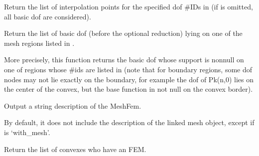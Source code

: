 \documentclass[a4paper,11pt,english]{sphinxmanual}
\begin{document}
\begin{fulllineitems}
\begin{fulllineitems}
Return the list of interpolation points for the specified
dof \#IDs in  (if  is omitted, all basic dof are
considered).

\end{fulllineitems}


\begin{fulllineitems}
\label{\detokenize{python/cmdref_MeshFem:getfem.MeshFem.basic_dof_on_region}}
Return the list of basic dof (before the optional reduction) lying on one
of the mesh regions listed in .

More precisely, this function returns the basic dof whose support is
non\sphinxhyphen{}null on one of regions whose \#ids are listed in  (note
that for boundary regions, some dof nodes may not lie exactly
on the boundary, for example the dof of Pk(n,0) lies on the center
of the convex, but the base function in not null on the convex
border).

\end{fulllineitems}


\begin{fulllineitems}
\label{\detokenize{python/cmdref_MeshFem:getfem.MeshFem.char}}
Output a string description of the MeshFem.

By default, it does not include the description of the linked mesh
object, except if  is ‘with\_mesh’.

\end{fulllineitems}


\begin{fulllineitems}
\label{\detokenize{python/cmdref_MeshFem:getfem.MeshFem.convex_index}}
Return the list of convexes who have an FEM.

\end{fulllineitems}


\end{fulllineitems}
\end{document}
